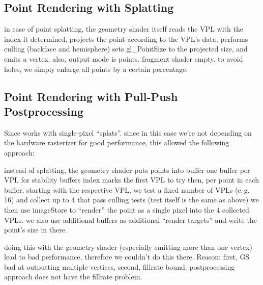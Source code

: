 \subsection{Point Rendering with Splatting}
\begin{outline}
\1 in case of point splatting, the geometry shader itself reads the VPL with the index it determined, projects the point according to the VPL's data, performs culling (backface and hemisphere) sets gl\_PointSize to the projected size, and emits a vertex.
\1 also, output mode is points. fragment shader empty.
\1 to avoid holes, we simply enlarge all points by a certain percentage.



\subsection{Point Rendering with Pull-Push Postprocessing}
\1 Since \citet{Marroquim:2007:reconstruction} works with single-pixel ``splats''. since in this case we're not depending on the hardware rasterizer for good performance, this allowed the following approach:

\1 instead of splatting, the geometry shader puts points into buffer
\1 one buffer per VPL for stability
\1 buffers index marks the first VPL to try
\1 then, per point in each buffer, starting with the respective VPL, we test a fixed number of VPLs (e.\,g. 16) and collect up to 4 that pass culling tests (test itself is the same as above)
\1 we then use imageStore to ``render'' the point as a single pixel into the 4 collected VPLs. we also use additional buffers as additional ``render targets'' and write the point's size in there.

\1 doing this with the geometry shader (especially emitting more than one vertex) lead to bad performance, therefore we couldn't do this there. Reason: first, GS bad at outputting multiple vertices, second, fillrate bound. postprocessing approach does not have the fillrate problem.


\end{outline}
